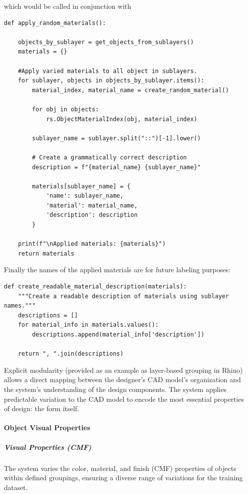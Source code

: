 \documentclass[12pt]{article}
\begin{document}
which would be called in conjunction with 

\begin{verbatim}
def apply_random_materials():

    objects_by_sublayer = get_objects_from_sublayers()
    materials = {}
    
    #Apply varied materials to all object in sublayers.
    for sublayer, objects in objects_by_sublayer.items():
        material_index, material_name = create_random_material()
        
        for obj in objects:
            rs.ObjectMaterialIndex(obj, material_index)
        
        sublayer_name = sublayer.split("::")[-1].lower()
        
        # Create a grammatically correct description
        description = f"{material_name} {sublayer_name}"
        
        materials[sublayer_name] = {
            'name': sublayer_name,
            'material': material_name,
            'description': description
        }
    
    print(f"\nApplied materials: {materials}")
    return materials

\end{verbatim}  

Finally the names of the applied materials are for future labeling purposes:
\begin{verbatim}
def create_readable_material_description(materials):
    """Create a readable description of materials using sublayer names."""
    descriptions = []
    for material_info in materials.values():
        descriptions.append(material_info['description'])
    
    return ", ".join(descriptions)
\end{verbatim}  

Explicit modularity (provided as an example as layer-based grouping in Rhino) allows a direct mapping between the designer's CAD model's organization and the system's understanding of the design components. The system applies predictable variation to the CAD model to encode the most essential properties of design: the form itself.

\paragraph{Object Visual Properties}

\subparagraph{Visual Properties (CMF)}
The system varies the color, material, and finish (CMF) properties of objects within defined groupings, ensuring a diverse range of variations for the training dataset.
\end{document}
